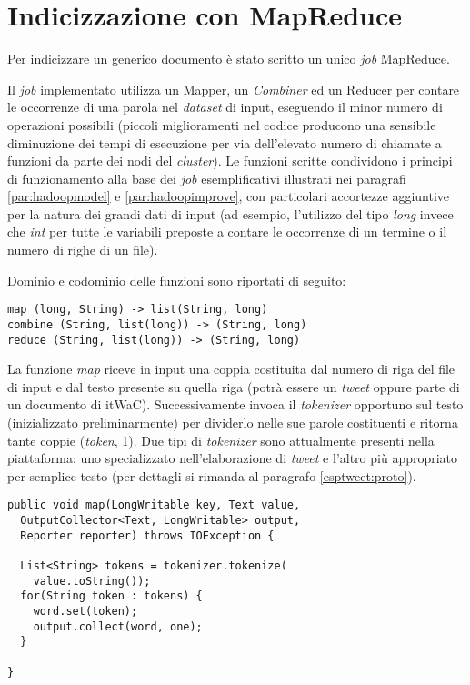 \section{Indicizzazione con MapReduce}
\label{mapredhadoop}

Per indicizzare un generico documento è stato scritto un unico \textit{job} MapReduce.

Il \textit{job} implementato utilizza un Mapper, un \textit{Combiner} ed un Reducer per contare le occorrenze di una parola nel \textit{dataset} di input, eseguendo il minor numero di operazioni 
possibili (piccoli miglioramenti nel codice producono una sensibile diminuzione dei tempi di esecuzione per via dell'elevato numero di chiamate a funzioni da parte dei 
nodi del \textit{cluster}).
Le funzioni scritte condividono i principi di funzionamento alla base dei \textit{job} esemplificativi illustrati nei paragrafi \ref{par:hadoopmodel} e \ref{par:hadoopimprove}, 
con particolari accortezze aggiuntive per la natura dei grandi dati di input (ad esempio, l'utilizzo del tipo \textit{long} invece che \textit{int} per tutte le variabili 
preposte a contare le occorrenze di un termine o il numero di righe di un file).

Dominio e codominio delle funzioni sono riportati di seguito:

\begin{lstlisting}[frame=single]
map (long, String) -> list(String, long)
combine (String, list(long)) -> (String, long)
reduce (String, list(long)) -> (String, long)
\end{lstlisting}

La funzione \textit{map} riceve in input una coppia costituita dal numero di riga del file di input e dal testo presente su quella riga (potrà essere un \textit{tweet} oppure parte di un documento di itWaC).
Successivamente invoca il \textit{tokenizer} opportuno sul testo (inizializzato preliminarmente) per dividerlo nelle sue parole costituenti e ritorna tante coppie (\textit{token}, 1). 
Due tipi di \textit{tokenizer} sono attualmente presenti nella piattaforma: uno specializzato nell’elaborazione di \textit{tweet} e l’altro più appropriato per semplice testo (per dettagli si rimanda al paragrafo \ref{esptweet:proto}).

\begin{lstlisting}[frame=single]
public void map(LongWritable key, Text value, 
  OutputCollector<Text, LongWritable> output, 
  Reporter reporter) throws IOException {
  
  List<String> tokens = tokenizer.tokenize(
    value.toString());
  for(String token : tokens) {
    word.set(token);
    output.collect(word, one);
  }
  
}
\end{lstlisting}

